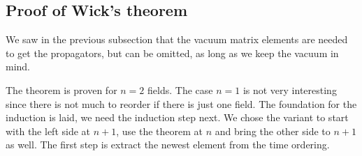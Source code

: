 \documentclass[11pt, english, fleqn, DIV=15, headinclude, BCOR=1cm]{scrartcl}
\begin{document}
\subsection{Proof of Wick's theorem}

We saw in the previous subsection that the vacuum matrix elements are needed to
get the propagators, but can be omitted, as long as we keep the vacuum in mind.

The theorem is proven for $n = 2$ fields. The case $n = 1$ is not very
interesting since there is not much to reorder if there is just one field. The
foundation for the induction is laid, we need the induction step next. We chose
the variant to start with the left side at $n+1$, use the theorem at $n$ and
bring the other side to $n+1$ as well. The first step is extract the newest
element from the time ordering.
\end{document}
